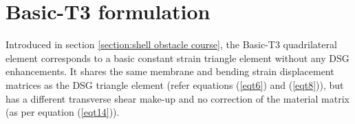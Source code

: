 
\chapter{Basic-T3 formulation}
\label{sec:Basic-T3 quadrilateral formulation}
\renewcommand{\Thema}{Basic-T3 quadrilateral formulation}

Introduced in section \ref{section:shell obstacle course}, the Basic-T3 quadrilateral element corresponds to a basic constant strain triangle element without any DSG enhancements. It shares the same membrane and bending strain displacement matrices as the DSG triangle element (refer equations (\ref{eqt6}) and (\ref{eqt8})), but has a different transverse shear make-up and no correction of the material matrix (as per equation (\ref{eqt14})). 

